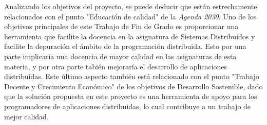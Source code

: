 Analizando los objetivos del proyecto, se puede deducir que están estrechamente relacionados con el punto "Educación de calidad" de la \textit{Agenda 2030}. Uno de los objetivos principales de este Trabajo de Fin de Grado es proporcionar una herramienta que facilite la docencia en la asignatura de Sistemas Distribuidos y facilite la depuración el ámbito de la programación distribuida. Esto por una parte implicaría una docencia de mayor calidad en las asignaturas de esta materia, y por otra parte tabién mejoraría el desarrollo de aplicaciones distribuidas. Este último aspecto también está relacionado con el punto "Trabajo Decente y Crecimiento Económico" de los objetivos de Desarrollo Sostenible, dado que la solución propuesta en este proyecto es una herramienta de apoyo para los programadores de aplicaciones distribuidas, lo cual contribuye a un trabajo de mejor calidad.
